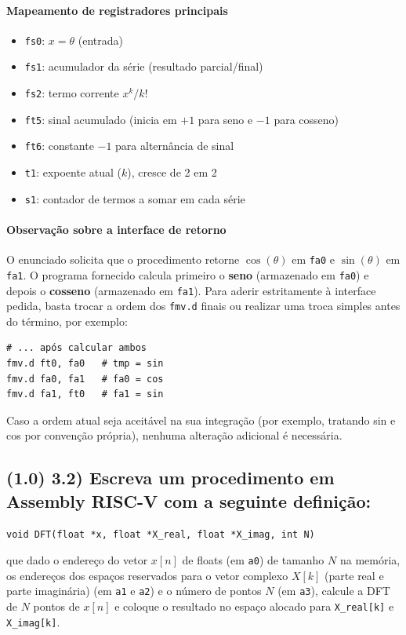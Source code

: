 \documentclass[12pt,a4paper]{article}
\begin{document}
\paragraph{Mapeamento de registradores principais}
\begin{itemize}
    \item \texttt{fs0}: \(x=\theta\) (entrada)
    \item \texttt{fs1}: acumulador da série (resultado parcial/final)
    \item \texttt{fs2}: termo corrente \(x^{k}/k!\)
    \item \texttt{ft5}: sinal acumulado (inicia em $+1$ para seno e $-1$ para cosseno)
    \item \texttt{ft6}: constante $-1$ para alternância de sinal
    \item \texttt{t1}: expoente atual (\(k\)), cresce de 2 em 2
    \item \texttt{s1}: contador de termos a somar em cada série
\end{itemize}

\paragraph{Observação sobre a interface de retorno}
O enunciado solicita que o procedimento retorne $\cos(\theta)$ em \texttt{fa0} e $\sin(\theta)$ em \texttt{fa1}. O programa fornecido calcula primeiro o \textbf{seno} (armazenado em \texttt{fa0}) e depois o \textbf{cosseno} (armazenado em \texttt{fa1}). Para aderir estritamente à interface pedida, basta trocar a ordem dos \texttt{fmv.d} finais ou realizar uma troca simples antes do término, por exemplo:
\begin{lstlisting}[language=Assembly]
# ... após calcular ambos
fmv.d ft0, fa0   # tmp = sin
fmv.d fa0, fa1   # fa0 = cos
fmv.d fa1, ft0   # fa1 = sin
\end{lstlisting}
Caso a ordem atual seja aceitável na sua integração (por exemplo, tratando sin e cos por convenção própria), nenhuma alteração adicional é necessária.

\subsection*{(1.0) 3.2) Escreva um procedimento em Assembly RISC-V com a seguinte definição:}

\begin{verbatim}
void DFT(float *x, float *X_real, float *X_imag, int N)
\end{verbatim}
que dado o endereço do vetor $x[n]$ de floats (em \texttt{a0}) de tamanho $N$ na memória, os endereços dos espaços reservados para o vetor complexo $X[k]$ (parte real e parte imaginária) (em \texttt{a1} e \texttt{a2}) e o número de pontos $N$ (em \texttt{a3}), calcule a DFT de $N$ pontos de $x[n]$ e coloque o resultado no espaço alocado para \texttt{X\_real[k]} e \texttt{X\_imag[k]}.
\end{document}
